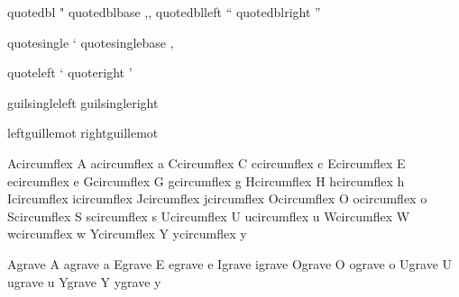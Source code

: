  quotedbl         {"}
 quotedblbase     {,,}
 quotedblleft     {``}
 quotedblright    {''}

 quotesingle      {`}
 quotesinglebase  {,}

 quoteleft        {`}
 quoteright       {'}

 guilsingleleft   {\fakeleftsubguillemot }
 guilsingleright  {\fakerightsubguillemot}

 leftguillemot    {\fakeleftguillemot }
 rightguillemot   {\fakerightguillemot}

 Acircumflex      {\buildtextaccent\textcircumflex A}
 acircumflex      {\buildtextaccent\textcircumflex a}
 Ccircumflex      {\buildtextaccent\textcircumflex C}
 ccircumflex      {\buildtextaccent\textcircumflex c}
 Ecircumflex      {\buildtextaccent\textcircumflex E}
 ecircumflex      {\buildtextaccent\textcircumflex e}
 Gcircumflex      {\buildtextaccent\textcircumflex G}
 gcircumflex      {\buildtextaccent\textcircumflex g}
 Hcircumflex      {\buildtextaccent\textcircumflex H}
 hcircumflex      {\buildtextaccent\textcircumflex h}
 Icircumflex      {\buildtextaccent\textcircumflex \dotlessI}
 icircumflex      {\buildtextaccent\textcircumflex \dotlessi}
 Jcircumflex      {\buildtextaccent\textcircumflex \dotlessJ}
 jcircumflex      {\buildtextaccent\textcircumflex \dotlessj}
 Ocircumflex      {\buildtextaccent\textcircumflex O}
 ocircumflex      {\buildtextaccent\textcircumflex o}
 Scircumflex      {\buildtextaccent\textcircumflex S}
 scircumflex      {\buildtextaccent\textcircumflex s}
 Ucircumflex      {\buildtextaccent\textcircumflex U}
 ucircumflex      {\buildtextaccent\textcircumflex u}
 Wcircumflex      {\buildtextaccent\textcircumflex W}
 wcircumflex      {\buildtextaccent\textcircumflex w}
 Ycircumflex      {\buildtextaccent\textcircumflex Y}
 ycircumflex      {\buildtextaccent\textcircumflex y}

 Agrave           {\buildtextaccent\textgrave A}
 agrave           {\buildtextaccent\textgrave a}
 Egrave           {\buildtextaccent\textgrave E}
 egrave           {\buildtextaccent\textgrave e}
 Igrave           {\buildtextaccent\textgrave \dotlessI}
 igrave           {\buildtextaccent\textgrave \dotlessi}
 Ograve           {\buildtextaccent\textgrave O}
 ograve           {\buildtextaccent\textgrave o}
 Ugrave           {\buildtextaccent\textgrave U}
 ugrave           {\buildtextaccent\textgrave u}
 Ygrave           {\buildtextaccent\textgrave Y}
 ygrave           {\buildtextaccent\textgrave y}


